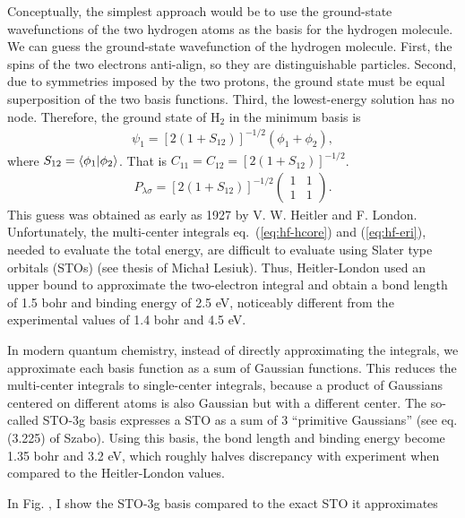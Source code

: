 \documentclass[draftthesis,fullpage]{uiucthesis}
\begin{document}
Conceptually, the simplest approach would be to use the ground-state wavefunctions of the two hydrogen atoms as the basis for the hydrogen molecule. We can guess the ground-state wavefunction of the hydrogen molecule. First, the spins of the two electrons anti-align, so they are distinguishable particles. Second, due to symmetries imposed by the two protons, the ground state must be equal superposition of the two basis functions. Third, the lowest-energy solution has no node. Therefore, the ground state of H$_2$ in the minimum basis is
\begin{align}
\psi_1 = \left[2(1+S_{12})\right]^{-1/2} \left(
\phi_1 + \phi_2
\right),
\end{align}
where $S_{12}=\braket{\phi_1|\phi_2}$. That is $C_{11}=C_{12}=\left[2(1+S_{12})\right]^{-1/2}$.
\begin{align}
P_{\lambda\sigma} = \left[2(1+S_{12})\right]^{-1/2}\left(\begin{array}{cc}
1 & 1 \\
1 & 1
\end{array}\right).
\end{align}
This guess was obtained as early as 1927 by V. W. Heitler and F. London. Unfortunately, the multi-center integrals eq.~(\ref{eq:hf-hcore}) and (\ref{eq:hf-eri}), needed to evaluate the total energy, are difficult to evaluate using Slater type orbitals (STOs) (see thesis of Michał Lesiuk). Thus, Heitler-London used an upper bound to approximate the two-electron integral and obtain a bond length of 1.5 bohr and binding energy of 2.5 eV, noticeably different from the experimental values of 1.4 bohr and 4.5 eV.

In modern quantum chemistry, instead of directly approximating the integrals, we approximate each basis function as a sum of Gaussian functions. This reduces the multi-center integrals to single-center integrals, because a product of Gaussians centered on different atoms is also Gaussian but with a different center. The so-called STO-3g basis expresses a STO as a sum of 3 ``primitive Gaussians'' (see eq. (3.225) of Szabo). Using this basis, the bond length and binding energy become 1.35 bohr and 3.2 eV, which roughly halves discrepancy with experiment when compared to the Heitler-London values.

In Fig. , I show the STO-3g basis compared to the exact STO it approximates

\begin{comment}
\begin{align}
\chi_{nlm}(r, \theta, \phi;\zeta) \equiv \dfrac{(2\zeta)^{n+1/2}}{\sqrt{(2n)!}}
r^{n-1}e^{-\zeta r} Y_{lm}(\theta, \phi).
\end{align}
\begin{align}
g(r; \sigma) = \dfrac{1}{\sigma\sqrt{2\pi}} e^{-\dfrac{r^2}{2\sigma^2}}.
\end{align}
\end{comment}
\end{document}
